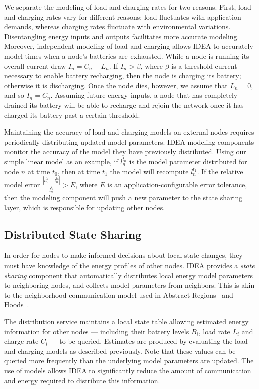 We separate the modeling of load and charging rates for two reasons. First,
load and charging rates vary for different reasons: load fluctuates with
application demands, whereas charging rates fluctuate with environmental
variations. Disentangling energy inputs and outputs facilitates more accurate
modeling. Moreover, independent modeling of load and charging allows IDEA to
accurately model times when a node's batteries are exhausted. While a node is
running its overall current draw $I_n = C_n - L_n$. If $I_n > \beta$, where
$\beta$ is a threshold current necessary to enable battery recharging, then
the node is charging its battery; otherwise it is discharging. Once the node
dies, however, we assume that $L_n = 0$, and so $I_n = C_n$. Assuming future
energy inputs, a node that has completely drained its battery will be able to
recharge and rejoin the network once it has charged its battery past a
certain threshold.

Maintaining the accuracy of load and charging models on external nodes
requires periodically distributing updated model parameters. IDEA modeling
components monitor the accuracy of the model they have previously
distributed. Using our simple linear model as an example, if $l_n^{t_0}$ is
the model parameter distributed for node $n$ at time $t_0$, then at time
$t_1$ the model will recompute $l_n^{t_1}$. If the relative model error
$\frac{\left| l_n^{t_1} - l_n^{t_0} \right|}{l_n^{t_0}} > E$, where $E$ is an
application-configurable error tolerance, then the modeling component will
push a new parameter to the state sharing layer, which is responsible for
updating other nodes.

\subsection{Distributed State Sharing}

In order for nodes to make informed decisions about local state changes, they
must have knowledge of the energy profiles of other nodes. IDEA provides a
\textit{state sharing} component that automatically distributes local energy
model parameters to neighboring nodes, and collects model parameters from
neighbors. This is akin to the neighborhood communication model used in
Abstract Regions~\cite{regions-nsdi04} and Hoods~\cite{hoods-mobisys}.

The distribution service maintains a local state table allowing estimated
energy information for other nodes --- including their battery levels $B_i$,
load rate $L_i$ and charge rate $C_i$ --- to be queried. Estimates are
produced by evaluating the load and charging models as described previously.
Note that these values can be queried more frequently than the underlying
model parameters are updated. The use of models allows IDEA to significantly
reduce the amount of communication and energy required to distribute this
information.

